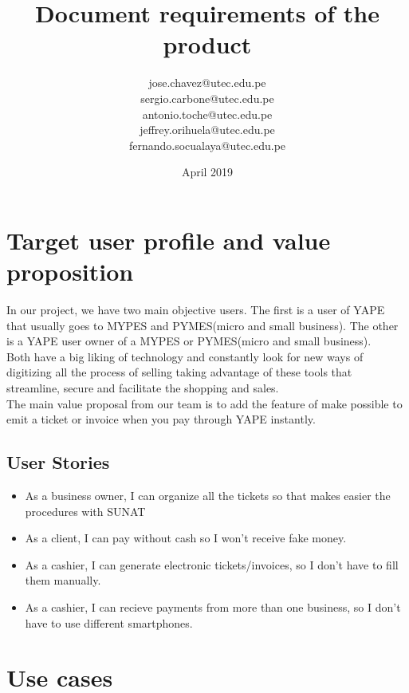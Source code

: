 \documentclass{article}
\title{Document requirements of the product}
\author{jose.chavez@utec.edu.pe \\ sergio.carbone@utec.edu.pe\\antonio.toche@utec.edu.pe\\jeffrey.orihuela@utec.edu.pe\\fernando.socualaya@utec.edu.pe}
\date{April 2019}
\begin{document}
\maketitle

\section{Target user profile and value proposition}
   In our project, we have two main objective users. The first is a user of YAPE that usually goes to MYPES and PYMES(micro and small business). The other is a YAPE user owner of a MYPES or PYMES(micro and small business).\\ Both have a big liking of technology and constantly look for new ways of digitizing all the process of selling taking advantage of these tools that streamline, secure and facilitate the shopping and sales.\\
   The main value proposal from our team is to add the feature of make possible to emit a ticket or invoice when you pay through YAPE instantly.
    \subsection{User Stories} 
    \begin{itemize}
    \item As a business owner, I can organize all the tickets so that makes easier the procedures with SUNAT
    \item As a client, I can pay without cash so I won't receive fake money.
    \item As a cashier, I can generate electronic tickets/invoices, so I don't have to fill them manually.
    \item As a cashier, I can recieve payments from more than one business, so I don't have to use different smartphones. 
    \end{itemize}
    
\section{Use cases}
\end{document}
